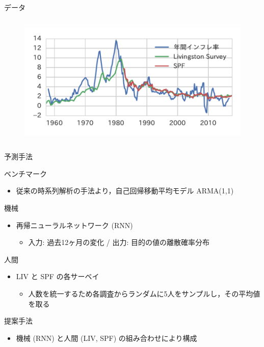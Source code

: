 \documentclass[dvipdfmx,aspectratio=169]{beamer}
\begin{document}
\begin{frame}{データ}
\begin{columns}
\begin{column}{0.4\textwidth}
\begin{figure}
      \includegraphics[width=\columnwidth]{slide-surveys.pdf}
    \end{figure}
  \end{column}
\end{columns}
\end{frame}

\begin{frame}{予測手法}
\begin{block}{ベンチマーク~\cite{Ang2007}}
  \begin{itemize}
    \item 従来の時系列解析の手法より，自己回帰移動平均モデル ARMA(1,1)
  \end{itemize}
\end{block}
\begin{block}{機械}
  \begin{itemize}
    \item 再帰ニューラルネットワーク (RNN)
    \begin{itemize}
      \item 入力: 過去12ヶ月の変化 / 出力: 目的の値の離散確率分布
    \end{itemize}
  \end{itemize}
\end{block}
\begin{block}{人間}
  \begin{itemize}
    \item LIV と SPF の各サーベイ
    \begin{itemize}
      \item 人数を統一するため各調査からランダムに5人をサンプルし，その平均値を取る
    \end{itemize}
  \end{itemize}
\end{block}
\begin{block}{提案手法}
  \begin{itemize}
    \item 機械 (RNN) と人間 (LIV, SPF) の組み合わせにより構成
  \end{itemize}
\end{block}
\end{frame}
\end{document}
